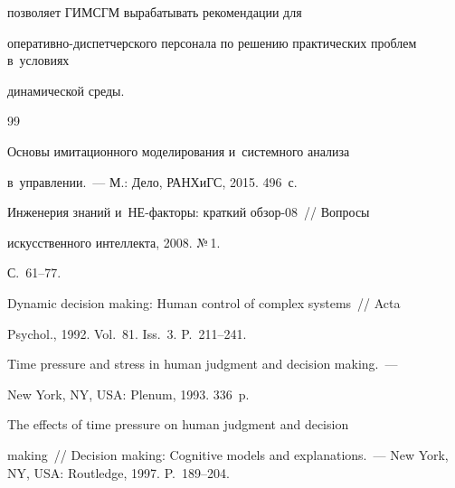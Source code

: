 позволяет ГИМСГМ вырабатывать рекомендации для


 опе\-ра\-тив\-но-дис\-пет\-чер\-ско\-го персонала по решению практических проблем в~условиях 


динамической среды.


  


   {\small\frenchspacing


   {%




   \begin{thebibliography}{99}


  




   Основы имитационного моделирования и~системного анализа 


  в~управлении.~--- М.: Дело, РАНХиГС, 2015. 496~с.




   Инженерия знаний и~НЕ-факторы: краткий обзор-08~/\!\!/ Вопросы 


искусственного интеллекта, 2008. №\,1. 


 С.~61--77.




   Dynamic decision making: Human control of complex systems~/\!\!/ Acta 


Psychol., 1992. Vol.~81. Iss.~3. P.~211--241.


  




   Time pressure and stress in human judgment and decision making.~--- 


New York, NY, USA: Plenum, 1993. 336~p.







   The effects of time pressure on human judgment and decision 


  making~/\!\!/ Decision making: Cognitive models and explanations.~--- New York, NY, USA: Routledge, 1997. P.~189--204. 


  





\end{thebibliography}}}
